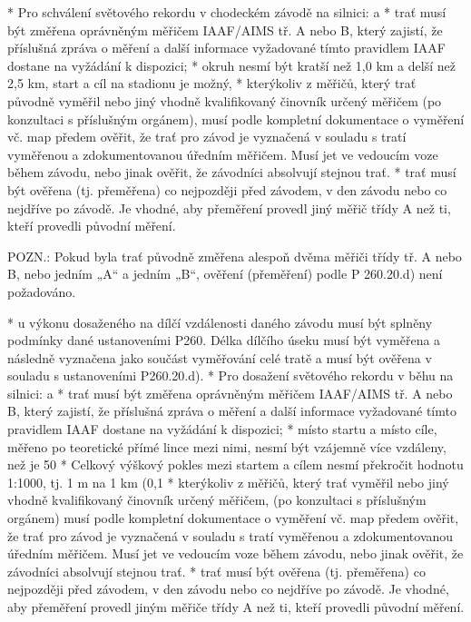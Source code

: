 * Pro schválení světového rekordu v chodeckém závodě na silnici:
  \begitems \style a
  * trať musí být změřena oprávněným měřičem IAAF/AIMS tř. A nebo B, který zajistí, že příslušná zpráva o měření a další informace vyžadované tímto pravidlem IAAF dostane na vyžádání k dispozici;
  * okruh nesmí být kratší než 1,0 km a delší než 2,5 km, start a cíl na stadionu je možný,
  * kterýkoliv z měřičů, který trať původně vyměřil nebo jiný vhodně kvalifikovaný činovník určený měřičem (po konzultaci s příslušným orgánem), musí podle kompletní dokumentace o vyměření vč. map předem ověřit, že trať pro závod je vyznačená v souladu s tratí vyměřenou a zdokumentovanou úředním měřičem. Musí jet ve vedoucím voze během závodu, nebo jinak ověřit, že závodníci absolvují stejnou trať.
  * trať musí být ověřena (tj. přeměřena) co nejpozději před závodem, v den závodu nebo co nejdříve po závodě. Je vhodné, aby přeměření provedl jiný měřič třídy A než ti, kteří provedli původní měření.

  POZN.: Pokud byla trať původně změřena alespoň dvěma měřiči třídy tř. A nebo B, nebo jedním „A“ a jedním „B“, ověření (přeměření) podle P 260.20.d) není požadováno.

  * u výkonu dosaženého na dílčí vzdálenosti daného závodu musí být splněny podmínky dané ustanoveními P260. Délka dílčího úseku musí být vyměřena a následně vyznačena jako součást vyměřování celé tratě a musí být ověřena v souladu s ustanoveními P260.20.d).
  \enditems
* Pro dosažení světového rekordu v běhu na silnici:
  \begitems \style a
  * trať musí být změřena oprávněným měřičem IAAF/AIMS tř. A nebo B, který zajistí, že příslušná zpráva o měření a další informace vyžadované tímto pravidlem IAAF dostane na vyžádání k dispozici;
  * místo startu a místo cíle, měřeno po teoretické přímé lince mezi nimi, nesmí být vzájemně více vzdáleny, než je 50 %
  * Celkový výškový pokles mezi startem a cílem nesmí překročit hodnotu 1:1000, tj. 1 m na 1 km (0,1 %
  * kterýkoliv z měřičů, který trať vyměřil nebo jiný vhodně kvalifikovaný činovník určený měřičem, (po konzultaci s příslušným orgánem) musí podle kompletní dokumentace o vyměření vč. map předem ověřit, že trať pro závod je vyznačená v souladu s tratí vyměřenou a zdokumentovanou úředním měřičem. Musí jet ve vedoucím voze během závodu, nebo jinak ověřit, že závodníci absolvují stejnou trať.
  * trať musí být ověřena (tj. přeměřena) co nejpozději před závodem, v den závodu nebo co nejdříve po závodě. Je vhodné, aby přeměření provedl jiným měřiče třídy A než ti, kteří provedli původní měření.

